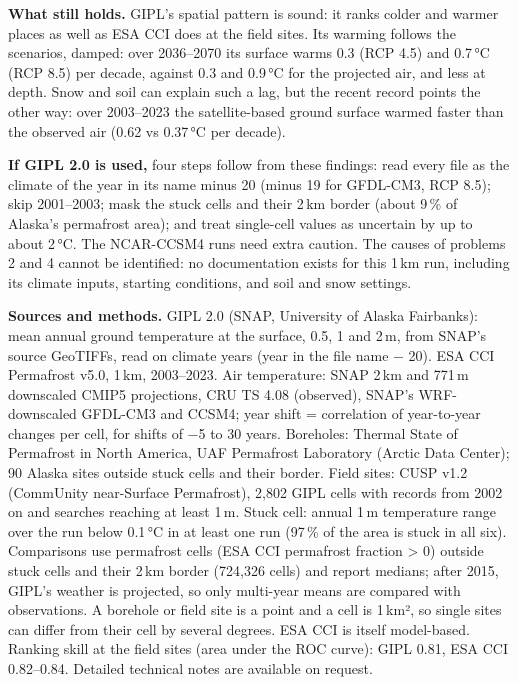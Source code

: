\documentclass[10pt]{article}
\renewcommand\footnotesize{\fontsize{6.7}{8.2}\selectfont}
\begin{document}
\vspace{2pt}
\noindent\colorbox{boxbg}{\parbox{\dimexpr\linewidth-2\fboxsep}{\raggedright\vspace{3pt}%
\textbf{What still holds.} GIPL's spatial pattern is sound: it ranks colder and warmer places as well as ESA CCI does
at the field sites. Its warming follows the scenarios, damped: over 2036--2070 its surface warms 0.3 (RCP 4.5) and
0.7\,°C (RCP 8.5) per decade, against 0.3 and 0.9\,°C for the projected air, and less at depth. Snow and soil can
explain such a lag, but the recent record points the other way: over 2003--2023 the satellite-based ground surface
warmed faster than the observed air (0.62 vs 0.37\,°C per decade).\par\vspace{4pt}
\textbf{If GIPL 2.0 is used,} four steps follow from these findings: read every file as the climate of the year in
its name minus 20 (minus 19 for GFDL-CM3, RCP 8.5); skip 2001--2003; mask the stuck cells and their 2\,km border
(about 9\,\% of Alaska's permafrost area); and treat single-cell values as uncertain by up to about 2\,°C. The
NCAR-CCSM4 runs need extra caution. The causes of problems 2 and 4 cannot be
identified: no documentation exists for this 1\,km run, including its climate inputs, starting conditions, and soil and
snow settings.\vspace{3pt}}}

\vspace{3pt}
{\footnotesize\color{ink2}
\textbf{Sources and methods.} GIPL 2.0 (SNAP, University of Alaska Fairbanks): mean annual ground temperature at the
surface, 0.5, 1 and 2\,m, from SNAP's source GeoTIFFs, read on climate years (year in the file name − 20). ESA CCI
Permafrost v5.0, 1\,km, 2003--2023. Air temperature: SNAP 2\,km and 771\,m downscaled CMIP5 projections, CRU TS 4.08
(observed), SNAP's WRF-downscaled GFDL-CM3 and CCSM4; year shift = correlation of year-to-year changes per cell, for
shifts of −5 to 30 years. Boreholes: Thermal State of Permafrost in North America, UAF Permafrost Laboratory (Arctic
Data Center); 90 Alaska sites outside stuck cells and their border. Field sites: CUSP v1.2 (CommUnity near-Surface
Permafrost), 2,802 GIPL cells with records from 2002 on and searches reaching at least 1\,m. Stuck cell: annual 1\,m
temperature range over the run below 0.1\,°C in at least one run (97\,\% of the area is stuck in all six). Comparisons
use permafrost cells (ESA CCI permafrost fraction > 0) outside stuck cells and their 2\,km border (724,326 cells) and
report medians; after 2015, GIPL's weather is projected, so only multi-year means are compared with observations. A
borehole or field site is a point and a cell is 1\,km², so single sites can differ from their cell by several degrees.
ESA CCI is itself model-based. Ranking skill at the field sites (area under the ROC curve): GIPL 0.81, ESA CCI
0.82--0.84. Detailed technical notes are available on request.\par}
\end{document}
